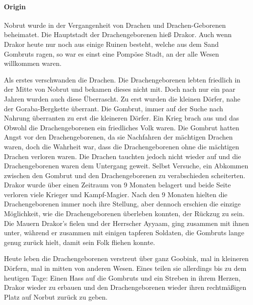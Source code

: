\paragraph{Origin}

Nobrut wurde in der Vergangenheit von Drachen und Drachen-Geborenen beheimatet. Die Hauptstadt der Drachengeborenen hieß Drakor. Auch wenn Drakor heute nur noch aus einige Ruinen besteht, welche aus dem Sand Gombruts ragen, so war es einst eine Pompöse Stadt, an der alle Wesen willkommen waren. 

Als erstes verschwanden die Drachen. Die Drachengeborenen lebten friedlich in der Mitte von Nobrut und bekamen dieses nicht mit. Doch nach nur ein paar Jahren wurden auch diese Überrascht. Zu erst wurden die kleinen Dörfer, nahe der Goraba-Bergkette überrant. Die Gombrut, immer auf der Suche nach Nahrung überranten zu erst die kleineren Dörfer. Ein Krieg brach aus und das Obwohl die Drachengeborenen ein friedliches Volk waren. Die Gombrut hatten Angst vor den Drachengeborenen, da sie Nachfahren der mächtigen Drachen waren, doch die Wahrheit war, dass die Drachengeborenen ohne die mächtigen Drachen verloren waren. Die Drachen tauchten jedoch nicht wieder auf und die Drachengeborenen waren dem Untergang geweit. Selbst Versuche, ein Abkommen zwischen den Gombrut und den Drachengeborenen zu verabschieden scheiterten. Drakor wurde über einen Zeitraum von 9 Monaten belagert und beide Seite verloren viele Krieger und Kampf-Magier. Nach den 9 Monaten hielten die Drachengeborenen immer noch ihre Stellung, aber dennoch erschien die einzige Möglichkeit, wie die Drachengeborenen überleben konnten, der Rückzug zu sein. Die Mauern Drakor's fielen und der Herrscher Ayyaam, ging zusammen mit ihnen unter, während er zusammen mit einigen tapferen Soldaten, die Gombruts lange genug zurück hielt, damit sein Folk fliehen konnte.

Heute leben die Drachengeborenen verstreut über ganz Goobink, mal in kleineren Dörfern, mal in mitten von anderen Wesen. Eines teilen sie allerdings bis zu dem heutigen Tage: Einen Hass auf die Gombruts und ein Streben in ihrem Herzen, Drakor wieder zu erbauen und den Drachengeborenen wieder ihren rechtmäßigen Platz auf Norbut zurück zu geben.